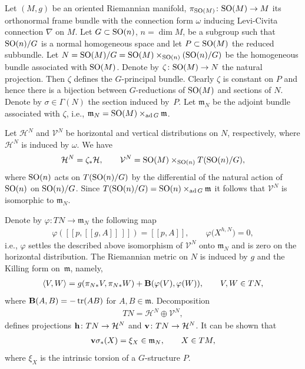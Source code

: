 \documentclass[pdftex]{sigma}
\numberwithin{equation}{section}
\newcommand{\skal}[2]{\langle #1,#2\rangle}
\begin{document}
Let $(M,g)$ be an oriented Riemannian manifold, $\pi_{{\rm SO}(M)}\colon {\rm SO}(M)\to M$ its orthonormal frame bundle with the connection form $\omega$ inducing Levi-Civita connection $\nabla$ on $M$. Let $G\subset {\rm SO}(n)$, $n=\dim M$, be a subgroup such that ${\rm SO}(n)/G$ is a normal homogeneous space and let $P\subset {\rm SO}(M)$ the reduced subbundle. Let $N={\rm SO}(M)/G={\rm SO}(M)\times_{{\rm SO}(n)} ({\rm SO}(n)/G)$ be the homogeneous bundle associated with ${\rm SO}(M)$. Denote by $\zeta\colon {\rm SO}(M)\to N$ the natural projection. Then $\zeta$ def\/ines the $G$-principal bundle. Clearly $\zeta$ is constant on $P$ and hence there is a bijection between $G$-reductions of ${\rm SO}(M)$ and sections of $N$. Denote by $\sigma\in \Gamma(N)$ the section induced by~$P$. Let $\mathfrak{m}_N$ be the adjoint bundle associated with $\zeta$, i.e., $\mathfrak{m}_N={\rm SO}(M)\times_{\operatorname{ad}G}\mathfrak{m}$.

Let $\mathcal{H}^N$ and $\mathcal{V}^N$ be horizontal and vertical distributions on $N$, respectively, where $\mathcal{H}^N$ is induced by $\omega$. We have
\begin{gather*}
\mathcal{H}^N=\zeta_{\ast}\mathcal{H},\qquad \mathcal{V}^N={\rm SO}(M)\times_{{\rm SO}(n)} T({\rm SO}(n)/G),
\end{gather*}
where ${\rm SO}(n)$ acts on $T({\rm SO}(n)/G)$ by the dif\/ferential of the natural action of ${\rm SO}(n)$ on ${\rm SO}(n)/G$. Since $T({\rm SO}(n)/G)={\rm SO}(n)\times_{\operatorname{ad}G}\mathfrak{m}$ it follows that $\mathcal{V}^N$ is isomorphic to $\mathfrak{m}_N$.

Denote by $\varphi\colon TN\to \mathfrak{m}_N$ the following map
\begin{gather*}
\varphi([[p,[[g,A]]\,]])=[[p,A]],\qquad \varphi\big(X^{h,N}\big)=0,
\end{gather*}
i.e., $\varphi$ settles the described above isomorphism of $\mathcal{V}^N$ onto $\mathfrak{m}_N$ and is zero on the horizontal distribution. The Riemannian metric on $N$ is induced by $g$ and the Killing form on~$\mathfrak{m}$, namely,
\begin{gather}\label{eq:riemmetriconN}
\skal{V}{W}=g(\pi_{N\ast}V,\pi_{N\ast}W)+{\bf B}(\varphi(V),\varphi(W)),\qquad V,W\in TN,
\end{gather}
where ${\bf B}(A,B)=-\operatorname{tr}(AB)$ for $A,B\in\mathfrak{m}$. Decomposition
\begin{gather*}
TN=\mathcal{H}^N\oplus\mathcal{V}^N,
\end{gather*}
def\/ines projections ${\bf h}\colon TN\to\mathcal{H}^N$ and ${\bf v}\colon TN\to\mathcal{H}^N$. It can be shown that~\cite{gmc2}
\begin{gather}\label{eq:verticalsigma}
{\bf v}\sigma_{\ast}(X)=\xi_X\in\mathfrak{m}_N,\qquad X\in TM,
\end{gather}
where $\xi_X$ is the intrinsic torsion of a $G$-structure $P$.
\end{document}
